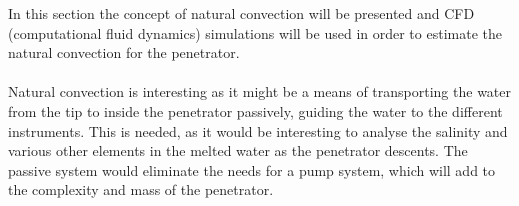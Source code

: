 
In this section the concept of natural convection will be presented and CFD (computational fluid dynamics) simulations will be used in order to estimate the natural convection for the penetrator.
\\
\\
Natural convection is interesting as it might be a means of transporting the water from the tip to inside the penetrator passively, guiding the water to the different instruments.  This is needed, as it would be interesting to analyse the salinity and various other elements in the melted water as the penetrator descents. The passive system would eliminate the needs for a pump system, which will add to the complexity and mass of the penetrator.

